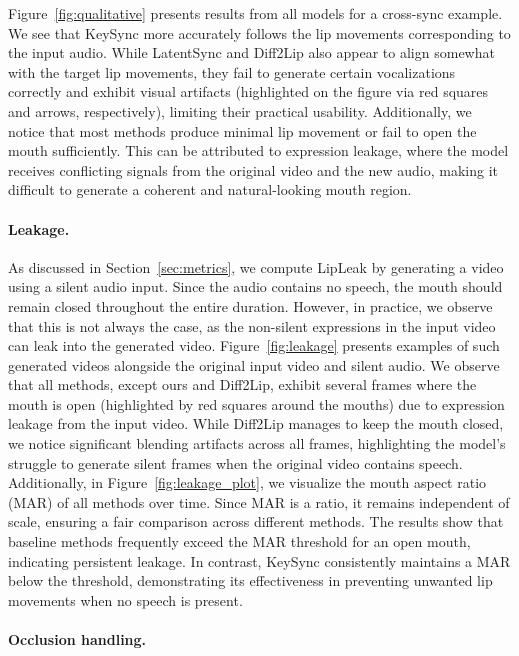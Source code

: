 Figure~\ref{fig:qualitative} presents results from all models for a cross-sync example. We see that KeySync more accurately follows the lip movements corresponding to the input audio. While LatentSync and Diff2Lip also appear to align somewhat with the target lip movements, they fail to generate certain vocalizations correctly and exhibit visual artifacts (highlighted on the figure via red squares and arrows, respectively), limiting their practical usability. Additionally, we notice that most methods produce minimal lip movement or fail to open the mouth sufficiently. This can be attributed to expression leakage, where the model receives conflicting signals from the original video and the new audio, making it difficult to generate a coherent and natural-looking mouth region.

\paragraph{Leakage.}

As discussed in Section~\ref{sec:metrics}, we compute LipLeak by generating a video using a silent audio input. Since the audio contains no speech, the mouth should remain closed throughout the entire duration. However, in practice, we observe that this is not always the case, as the non-silent expressions in the input video can leak into the generated video. Figure~\ref{fig:leakage} presents examples of such generated videos alongside the original input video and silent audio. We observe that all methods, except ours and Diff2Lip, exhibit several frames where the mouth is open (highlighted by red squares around the mouths) due to expression leakage from the input video. While Diff2Lip manages to keep the mouth closed, we notice significant blending artifacts across all frames, highlighting the model’s struggle to generate silent frames when the original video contains speech. Additionally, in Figure~\ref{fig:leakage_plot}, we visualize the mouth aspect ratio (MAR) of all methods over time. Since MAR is a ratio, it remains independent of scale, ensuring a fair comparison across different methods. The results show that baseline methods frequently exceed the MAR threshold for an open mouth, indicating persistent leakage. In contrast, KeySync consistently maintains a MAR below the threshold, demonstrating its effectiveness in preventing unwanted lip movements when no speech is present.


\paragraph{Occlusion handling.}





